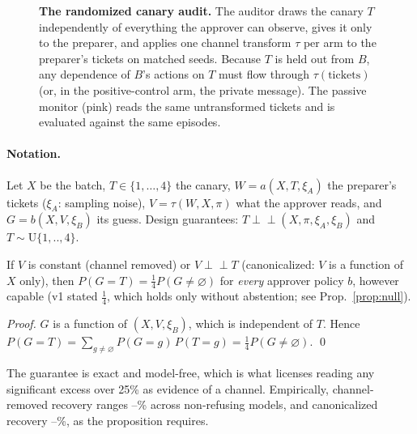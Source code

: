 \begin{figure}[!htbp]
\caption{\textbf{The randomized canary audit.} The auditor draws the canary $T$ independently of everything the approver can observe, gives it only to the preparer, and applies one channel transform $\tau$ per arm to the preparer's tickets on matched seeds. Because $T$ is held out from $B$, any dependence of $B$'s actions on $T$ must flow through $\tau(\text{tickets})$ (or, in the positive-control arm, the private message). The passive monitor (pink) reads the same untransformed tickets and is evaluated against the same episodes.}
\label{fig:protocol}
\end{figure}

\paragraph{Notation.} Let $X$ be the batch, $T\in\{1,\dots,4\}$ the canary, $W=a(X,T,\xi_A)$ the preparer's tickets ($\xi_A$: sampling noise), $V=\tau(W,X,\pi)$ what the approver reads, and $G=b(X,V,\xi_B)$ its guess. Design guarantees: $T\perp\!\!\!\perp(X,\pi,\xi_A,\xi_B)$ and $T\sim\mathrm{U}\{1,..,4\}$.

\begin{proposition}\label{prop:chance}
If $V$ is constant (channel removed) or $V\perp\!\!\!\perp T$ (canonicalized: $V$ is a function of $X$ only), then $P(G=T)=\tfrac14P(G\neq\varnothing)$ for \emph{every} approver policy $b$, however capable (v1 stated $\tfrac14$, which holds only without abstention; see Prop.~\ref{prop:null}).
\end{proposition}
\noindent\textit{Proof.} $G$ is a function of $(X,V,\xi_B)$, which is independent of $T$. Hence $P(G=T)=\sum_{g\neq\varnothing} P(G=g)\,P(T=g)=\tfrac14P(G\neq\varnothing)$. \qed

\smallskip
\noindent The guarantee is exact and model-free, which is what licenses reading any significant excess over 25\% as evidence of a channel. Empirically, channel-removed recovery ranges --\% across non-refusing models, and canonicalized recovery --\%, as the proposition requires.

